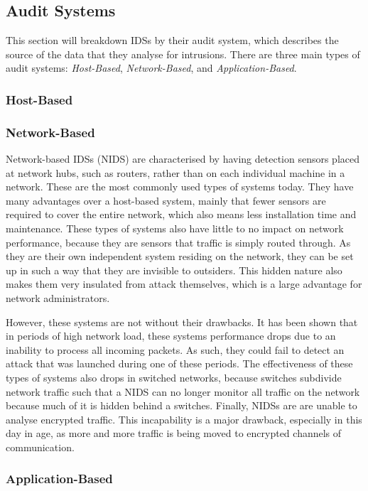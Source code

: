 \documentclass{acm_proc_article-sp}
\begin{document}
    \subsection{Audit Systems}
    	This section will breakdown IDSs by their audit system, which describes the source of the data that they analyse for intrusions. There are three main types of audit systems: \emph{Host-Based}, \emph{Network-Based}, and \emph{Application-Based}.
    	\subsubsection{Host-Based}
    	\subsubsection{Network-Based}
    		Network-based IDSs (NIDS) are characterised by having detection sensors placed at network hubs, such as routers, rather than on each individual machine in a network. These are the most commonly used types of systems today. They have many advantages over a host-based system, mainly that fewer sensors are required to cover the entire network, which also means less installation time and maintenance. These types of systems also have little to no impact on network performance, because they are sensors that traffic is simply routed through. As they are their own independent system residing on the network, they can be set up in such a way that they are invisible to outsiders. This hidden nature also makes them very insulated from attack themselves, which is a large advantage for network administrators. 
    		
    		However, these systems are not without their drawbacks. It has been shown that in periods of high network load, these systems performance drops due to an inability to process all incoming packets. As such, they could fail to detect an attack that was launched during one of these periods. The effectiveness of these types of systems also drops in switched networks, because switches subdivide network traffic such that a NIDS can no longer monitor all traffic on the network because much of it is hidden behind a switches. Finally, NIDSs are are unable to analyse encrypted traffic. This incapability is a major drawback, especially in this day in age, as more and more traffic is being moved to encrypted channels of communication. 		
    	\subsubsection{Application-Based}
\end{document}

